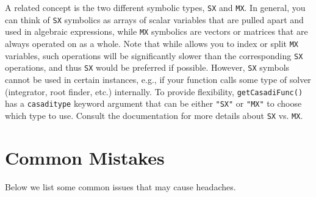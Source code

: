 \documentclass{article}
\begin{document}
A related concept is the two different \casadi{} symbolic types, \lstinline|SX| and \lstinline|MX|.
In general, you can think of \lstinline|SX| symbolics as arrays of scalar variables that are pulled apart and used in algebraic expressions, while \lstinline|MX| symbolics are vectors or matrices that are always operated on as a whole.
Note that while \casadi{} allows you to index or split \lstinline|MX| variables, such operations will be significantly slower than the corresponding \lstinline|SX| operations, and thus \lstinline|SX| would be preferred if possible.
However, \lstinline|SX| symbols cannot be used in certain instances, e.g., if your function calls some type of solver (integrator, root finder, etc.) internally.
To provide flexibility, \lstinline|getCasadiFunc()| has a \lstinline|casaditype| keyword argument that can be either \lstinline|"SX"| or \lstinline|"MX"| to choose which type to use.
Consult the \casadi{} documentation for more details about \lstinline|SX| vs. \lstinline|MX|.

\section{Common Mistakes}

Below we list some common issues that may cause headaches.
\end{document}

